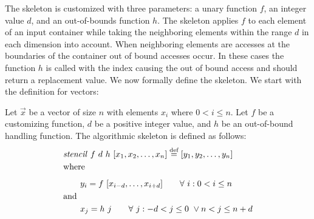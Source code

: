 The \stencil skeleton is customized with three parameters: a unary function $f$, an integer value $d$, and an out-of-bounds function $h$.
The skeleton applies $f$ to each element of an input container while taking the neighboring elements within the range $d$ in each dimension into account.
When neighboring elements are accesses at the boundaries of the container out of bound accesses occur.
In these cases the function $h$ is called with the index causing the out of bound access and should return a replacement value.
We now formally define the \stencil skeleton. We start with the definition for vectors:
\begin{definition}
  \label{definition:mapoverlap}
  Let $\vec{x}$ be a vector of size $n$ with elements $x_i$ where $0 < i \leq n$.
  Let $f$ be a customizing function, $d$ be a positive integer value, and $h$ be an out-of-bound handling function.
  The algorithmic skeleton \stencil is defined as follows:
  \begin{equation*}
    \begin{split}
    &\stencil\ f\  d\ h\ [x_1, x_2, \ldots, x_n] \eqdef [y_1, y_2, \dots, y_n]\\
    &\text{where}\\[.5em]
    &\qquad y_i = f\ [x_{i-d}, \ldots, x_{i+d}] \qquad \forall\ i :  0 < i \leq n\\
    &\text{and\hfill}\\
    &\qquad x_j = h\ j \qquad \forall\ j : -d < j \leq 0\ \vee n < j \leq n+d
    \end{split}
  \end{equation*}
\end{definition}


